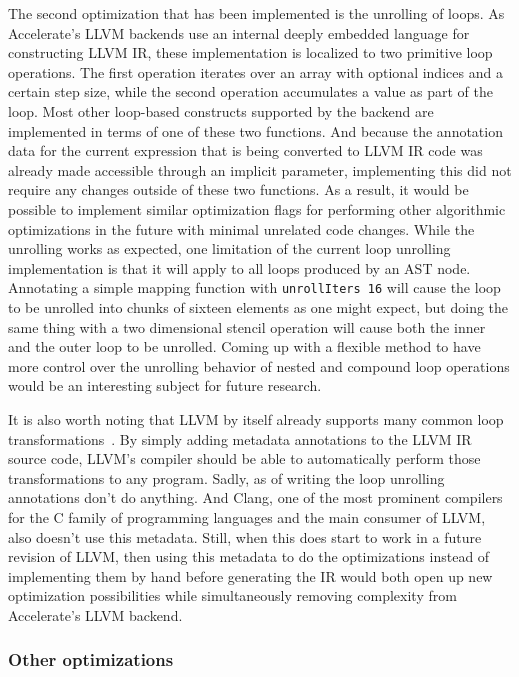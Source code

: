 \documentclass[fontsize=11pt,a4paper,parskip=half,numbers=noenddot]{scrartcl}
\newcommand{\hask}[1]{\texttt{#1}}
\begin{document}
The second optimization that has been implemented is the unrolling of loops. As
Accelerate's LLVM backends use an internal deeply embedded language for
constructing LLVM IR, these implementation is localized to two primitive loop
operations. The first operation iterates over an array with optional indices and
a certain step size, while the second operation accumulates a value as part of
the loop. Most other loop-based constructs supported by the backend are
implemented in terms of one of these two functions. And because the annotation
data for the current expression that is being converted to LLVM IR code was
already made accessible through an implicit parameter, implementing this did not
require any changes outside of these two functions. As a result, it would be
possible to implement similar optimization flags for performing other
algorithmic optimizations in the future with minimal unrelated code changes.
While the unrolling works as expected, one limitation of the current loop
unrolling implementation is that it will apply to all loops produced by an AST
node. Annotating a simple mapping function with \hask{unrollIters 16} will cause
the loop to be unrolled into chunks of sixteen elements as one might expect, but
doing the same thing with a two dimensional stencil operation will cause both
the inner and the outer loop to be unrolled. Coming up with a flexible method to
have more control over the unrolling behavior of nested and compound loop
operations would be an interesting subject for future research.

It is also worth noting that LLVM by itself already supports many common loop
transformations~\cite{llvm-code-transformation-metadata}. By simply adding
metadata annotations to the LLVM IR source code, LLVM's compiler should be able
to automatically perform those transformations to any program. Sadly, as of
writing the loop unrolling annotations don't do anything. And Clang, one of the
most prominent compilers for the C family of programming languages and the main
consumer of LLVM, also doesn't use this metadata. Still, when this does start to
work in a future revision of LLVM, then using this metadata to do the
optimizations instead of implementing them by hand before generating the IR
would both open up new optimization possibilities while simultaneously removing
complexity from Accelerate's LLVM backend.

\subsubsection{Other optimizations}
\end{document}
